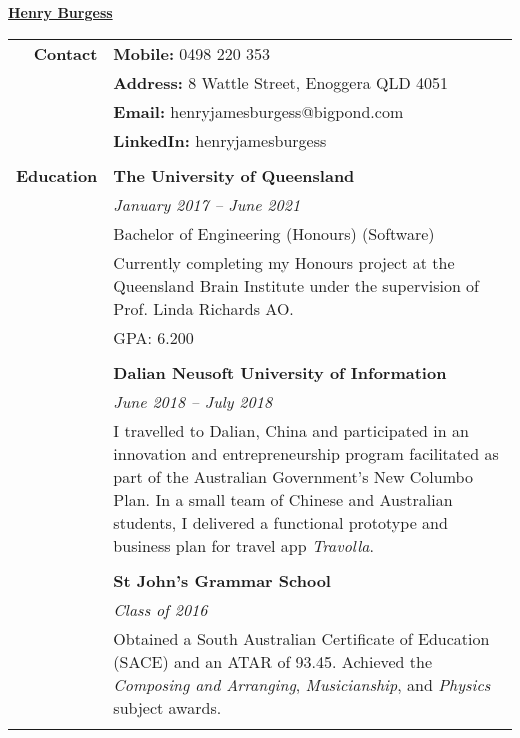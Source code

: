 \documentclass[12pt,twoside,a4paper]{article}
\begin{document}
\begin{center}
	\huge{\underline{\textbf{Henry Burgess}}}
\end{center}

\begin{longtable}{r p{13cm}} 
	\textbf{Contact} 			\vline &	 \textbf{Mobile:}  0498 220 353 \\ 
										\vline &	\textbf{Address:} 8 Wattle Street, Enoggera QLD 4051 \\
										\vline &	\textbf{Email:} henryjamesburgess@bigpond.com \\
										\vline &	\textbf{LinkedIn:} henryjamesburgess \\
										& \\
										
	\textbf{Education} 		\vline & \textbf{The University of Queensland} \\
										\vline & \textit{January 2017 – June 2021} \\
										\vline & Bachelor of Engineering (Honours) (Software) \\
										\vline & Currently completing my Honours project at the Queensland Brain Institute under the supervision of Prof. Linda Richards AO. \\
										\vline & GPA: 6.200 \\
										\vline & \\
										
										\vline & \textbf{Dalian Neusoft University of Information} \\
										\vline & \textit{June 2018 – July 2018} \\
										\vline & I travelled to Dalian, China and participated in an innovation and entrepreneurship program facilitated as part of the Australian Government’s New Columbo Plan. In a small team of Chinese and Australian students, I delivered a functional prototype and business plan for travel app \textit{Travolla}. \\
										\vline & \\
										
										\vline & \textbf{St John’s Grammar School} \\
										\vline & \textit{Class of 2016} \\
										\vline & Obtained a South Australian Certificate of Education (SACE) and an ATAR of 93.45. Achieved the \textit{Composing and Arranging}, \textit{Musicianship}, and \textit{Physics} subject awards. \\
										\vline & \\
										

\end{longtable}
\end{document}
